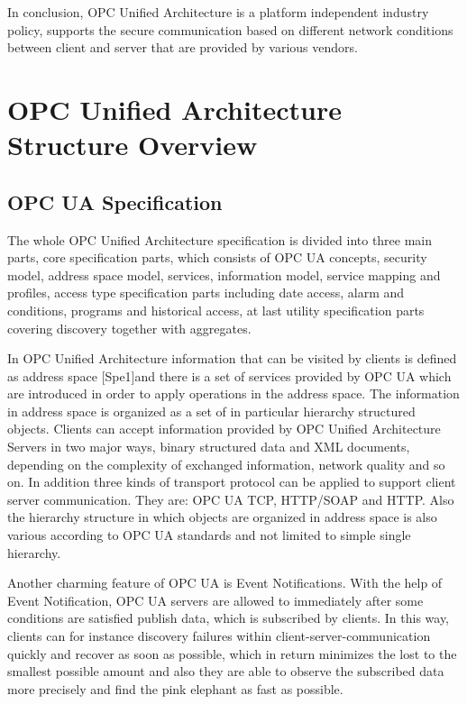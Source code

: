 \documentclass[]{llncs}
\begin{document}
In conclusion, OPC Unified Architecture is a platform independent industry policy, supports the secure communication based on different network conditions between client and server that are provided by various vendors. 





\section{OPC Unified Architecture Structure Overview }

\subsection{OPC UA Specification}

The whole OPC Unified Architecture specification is divided into three main parts, core specification parts, which consists of OPC UA concepts, security model, address space model, services, information model, service mapping and profiles, access type specification parts including date access, alarm and conditions, programs and historical access, at last utility specification parts covering discovery together with aggregates. 


In OPC Unified Architecture information that can be visited by clients is defined as address space [Spe1]and there is a set of services provided by OPC UA which are introduced in order to apply operations in the address space. The information in address space is organized as a set of in particular hierarchy structured objects. Clients can accept information provided by OPC Unified Architecture Servers in two major ways, binary structured data and XML documents, depending on the complexity of exchanged information, network quality and so on. In addition three kinds of transport protocol can be applied to support client server communication. They are: OPC UA TCP, HTTP/SOAP and HTTP. Also the hierarchy structure in which objects are organized in address space is also various according to OPC UA standards and not limited to simple single hierarchy.   


Another charming feature of OPC UA is Event Notifications. With the help of Event Notification, OPC UA servers are allowed to immediately after some conditions are satisfied publish data, which is subscribed by clients. In this way, clients can for instance discovery failures within client-server-communication quickly and recover as soon as possible, which in return minimizes the lost to the smallest possible amount and also they are able to observe the subscribed data more precisely and find the pink elephant as fast as possible.
\end{document}
